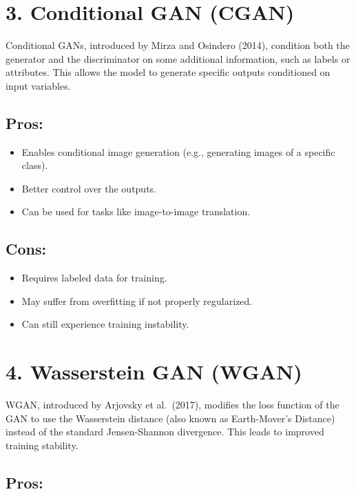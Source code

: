 \documentclass[
]{book}
\providecommand{\tightlist}{%
  \setlength{\itemsep}{0pt}\setlength{\parskip}{0pt}}
\begin{document}
\section{3. Conditional GAN (CGAN)}\label{conditional-gan-cgan}

Conditional GANs, introduced by Mirza and Osindero (2014), condition both the generator and the discriminator on some additional information, such as labels or attributes. This allows the model to generate specific outputs conditioned on input variables.

\subsection{Pros:}\label{pros-2}

\begin{itemize}
\tightlist
\item
  Enables conditional image generation (e.g., generating images of a specific class).
\item
  Better control over the outputs.
\item
  Can be used for tasks like image-to-image translation.
\end{itemize}

\subsection{Cons:}\label{cons-2}

\begin{itemize}
\tightlist
\item
  Requires labeled data for training.
\item
  May suffer from overfitting if not properly regularized.
\item
  Can still experience training instability.
\end{itemize}

\section{4. Wasserstein GAN (WGAN)}\label{wasserstein-gan-wgan}

WGAN, introduced by Arjovsky et al.~(2017), modifies the loss function of the GAN to use the Wasserstein distance (also known as Earth-Mover's Distance) instead of the standard Jensen-Shannon divergence. This leads to improved training stability.

\subsection{Pros:}\label{pros-3}
\end{document}
